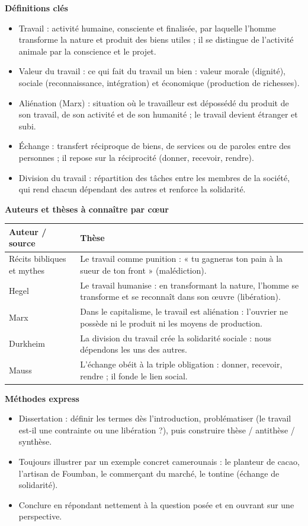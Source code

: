 \documentclass[11pt]{article}
\newcommand{\cle}[1]{{\popxbold\color{popdark}#1}}
\begin{document}
\begin{bilan}
\textbf{Définitions clés}
\begin{itemize}
\item \cle{Travail} : activité humaine, consciente et finalisée, par laquelle l'homme transforme la nature et produit des biens utiles ; il se distingue de l'activité animale par la conscience et le projet.
\item \cle{Valeur du travail} : ce qui fait du travail un bien : valeur morale (dignité), sociale (reconnaissance, intégration) et économique (production de richesses).
\item \cle{Aliénation} (Marx) : situation où le travailleur est dépossédé du produit de son travail, de son activité et de son humanité ; le travail devient étranger et subi.
\item \cle{Échange} : transfert réciproque de biens, de services ou de paroles entre des personnes ; il repose sur la \cle{réciprocité} (donner, recevoir, rendre).
\item \cle{Division du travail} : répartition des tâches entre les membres de la société, qui rend chacun dépendant des autres et renforce la solidarité.
\end{itemize}

\textbf{Auteurs et thèses à connaître par cœur}
\begin{center}
\begin{tabularx}{\linewidth}{|l|X|}\hline
\rowcolor{popblueL} \textbf{Auteur / source} & \textbf{Thèse} \\ \hline
Récits bibliques et mythes & Le travail comme punition : « tu gagneras ton pain à la sueur de ton front » (malédiction). \\ \hline
Hegel & Le travail humanise : en transformant la nature, l'homme se transforme et se reconnaît dans son œuvre (libération). \\ \hline
Marx & Dans le capitalisme, le travail est aliénation : l'ouvrier ne possède ni le produit ni les moyens de production. \\ \hline
Durkheim & La division du travail crée la solidarité sociale : nous dépendons les uns des autres. \\ \hline
Mauss & L'échange obéit à la triple obligation : donner, recevoir, rendre ; il fonde le lien social. \\ \hline
\end{tabularx}
\end{center}

\textbf{Méthodes express}
\begin{itemize}
\item Dissertation : définir les termes dès l'introduction, problématiser (le travail est-il une contrainte ou une libération ?), puis construire thèse / antithèse / synthèse.
\item Toujours illustrer par un exemple concret camerounais : le planteur de cacao, l'artisan de Foumban, le commerçant du marché, le tontine (échange de solidarité).
\item Conclure en répondant nettement à la question posée et en ouvrant sur une perspective.
\end{itemize}
\end{bilan}
\end{document}
